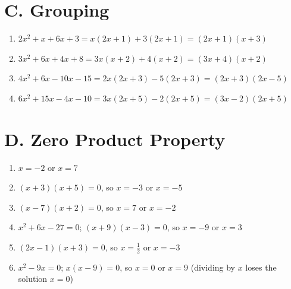 \documentclass[12pt]{article}
\begin{document}
\section*{C. Grouping}
\begin{enumerate}[itemsep=2pt]
  \item $2x^2 + x + 6x + 3 = x(2x+1) + 3(2x+1) = (2x+1)(x+3)$
  \item $3x^2 + 6x + 4x + 8 = 3x(x+2) + 4(x+2) = (3x+4)(x+2)$
  \item $4x^2 + 6x - 10x - 15 = 2x(2x+3) - 5(2x+3) = (2x+3)(2x-5)$
  \item $6x^2 + 15x - 4x - 10 = 3x(2x+5) - 2(2x+5) = (3x-2)(2x+5)$
\end{enumerate}

\section*{D. Zero Product Property}
\begin{enumerate}[itemsep=2pt]
  \item $x = -2$ or $x = 7$
  \item $(x+3)(x+5) = 0$, so $x = -3$ or $x = -5$
  \item $(x-7)(x+2) = 0$, so $x = 7$ or $x = -2$
  \item $x^2 + 6x - 27 = 0$; $(x+9)(x-3) = 0$, so $x = -9$ or $x = 3$
  \item $(2x-1)(x+3) = 0$, so $x = \tfrac{1}{2}$ or $x = -3$
  \item $x^2 - 9x = 0$; $x(x-9) = 0$, so $x = 0$ or $x = 9$ \; (dividing by $x$ loses the solution $x = 0$)
\end{enumerate}
\end{document}
